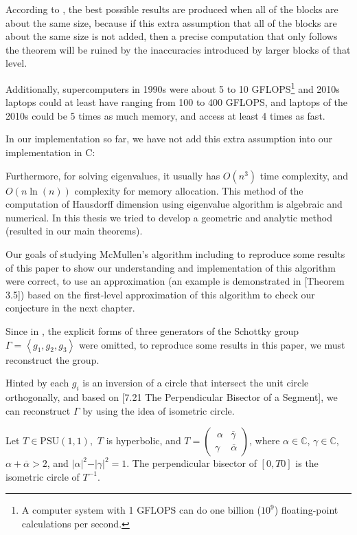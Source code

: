 \documentclass[12pt,oneside]{sfsuthesis}
\theoremstyle{plain} %
\theoremstyle{definition}  %
\theoremstyle{remark}  %
\theoremstyle{plain}
\begin{document}
{According to \cite{mcmullen1998hausdorff}, the best possible results are produced when all of the blocks are about the same size, because if this extra assumption that all of the blocks are about the same size is not added, then a precise computation that only follows the theorem will be ruined by the inaccuracies introduced by larger blocks of that level.

Additionally, supercomputers in 1990s were about 5 to 10 GFLOPS\footnote{A computer system with 1 GFLOPS can do one billion ($10^9$) floating-point calculations per second.} and 2010s laptops could at least have ranging from 100 to 400 GFLOPS, and laptops of the 2010s could be 5 times as much memory, and access at least 4 times as fast.  

In our implementation so far, we have not add this extra assumption into our implementation in C:

 

Furthermore, for solving eigenvalues, it usually has $O(n^3)$ time complexity, and $O(n\ln(n))$ complexity for memory allocation. This method of the computation of Hausdorff dimension using eigenvalue algorithm is algebraic and numerical. In this thesis we tried to develop a geometric and analytic method (resulted in our main theorems).

Our goals of studying McMullen's algorithm including to reproduce some results of this paper to show our understanding and implementation of this algorithm were correct, to use an approximation (an example is demonstrated in \cite{mcmullen1998hausdorff}[Theorem 3.5]) based on the first-level approximation of this algorithm to check our conjecture in the next chapter.

Since in \cite{mcmullen1998hausdorff}, the explicit forms of three generators of the Schottky group $\Gamma=\left\langle g_1, g_2, g_3\right\rangle$ were omitted, to reproduce some results in this paper, we must reconstruct the group.

Hinted by each $g_i$ is an inversion of a circle that intersect the unit circle orthogonally, and based on \cite{beardon2012geometry}[7.21 The Perpendicular Bisector of a Segment], we can reconstruct $\Gamma$ by using the idea of isometric circle.

Let $T\in \text{PSU}(1,1),$ $T$ is hyperbolic, and $T=\begin{pmatrix}\
\alpha &  \overline{\gamma}\\
\gamma &  \overline{\alpha}
\end{pmatrix}$, where $\alpha\in\mathbb{C}$, $\gamma\in\mathbb{C}$, $\alpha+\overline{\alpha}>2$, and $\vert \alpha\vert^2- \vert \gamma\vert^2=1$. The perpendicular bisector of $[0,T0]$ is the isometric circle of $T^{-1}$. 

}
\end{document}
